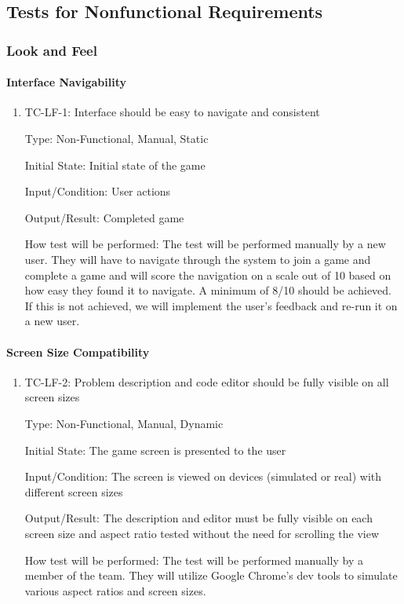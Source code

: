 \documentclass[12pt, titlepage]{article}
\begin{document}
\subsection{Tests for Nonfunctional Requirements}

\subsubsection{Look and Feel}

\paragraph{Interface Navigability}

\begin{enumerate}
\item{TC-LF-1: Interface should be easy to navigate and consistent}

Type: Non-Functional, Manual, Static
					
Initial State: Initial state of the game
					
Input/Condition: User actions
					
Output/Result: Completed game
					
How test will be performed: The test will be performed manually by a new user. They will have to navigate through the system to join a game and complete a game and will score the navigation on a scale out of 10 based on how easy they found it to navigate. A minimum of 8/10 should be achieved. If this is not achieved, we will implement the user's feedback and  re-run it on a new user.
\end{enumerate}

\paragraph{Screen Size Compatibility}

\begin{enumerate}
\item{TC-LF-2: Problem description and code editor should be fully visible on all screen sizes}

Type: Non-Functional, Manual, Dynamic
					
Initial State: The game screen is presented to the user
					
Input/Condition: The screen is viewed on devices (simulated or real) with different screen sizes
					
Output/Result: The description and editor must be fully visible on each screen size and aspect ratio tested without the need for scrolling the view
					
How test will be performed: The test will be performed manually by a member of the team. They will utilize Google Chrome's dev tools to simulate various aspect ratios and screen sizes.
\end{enumerate}
\end{document}
